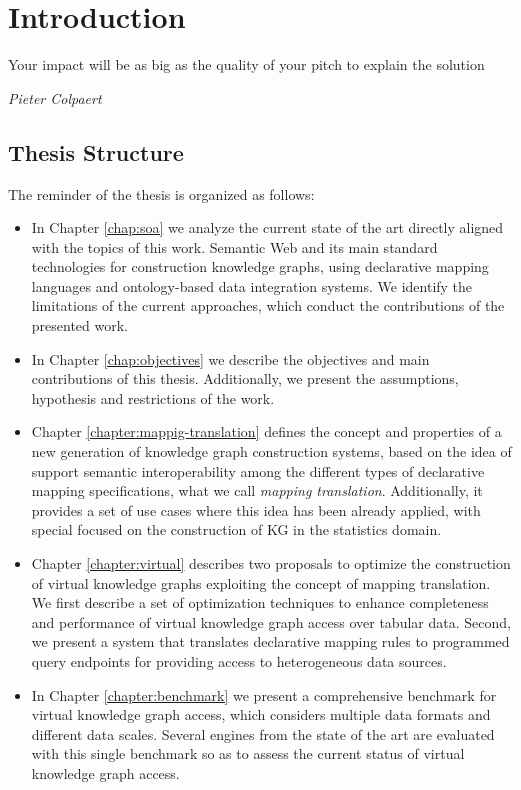 \chapter{Introduction}
\label{chap:intro}

\epigraph{Your impact will be as big as the quality of your pitch to explain the solution}{\textit{Pieter Colpaert}}

\section{Thesis Structure}
\label{sec:thesisstructure}
The reminder of the thesis is organized as follows:
\begin{itemize}
    \item In Chapter \ref{chap:soa} we analyze the current state of the art directly aligned with the topics of this work. Semantic Web and its main standard technologies for construction knowledge graphs, using declarative mapping languages and ontology-based data integration systems. We identify the limitations of the current approaches, which conduct the contributions of the presented work.
    \item In Chapter \ref{chap:objectives} we describe the objectives and main contributions of this thesis. Additionally, we present the assumptions, hypothesis and restrictions of the work.
    \item Chapter \ref{chapter:mappig-translation} defines the concept and properties of a new generation of knowledge graph construction systems, based on the idea of support semantic interoperability among the different types of declarative mapping specifications, what we call \textit{mapping translation}. Additionally, it provides a set of use cases where this idea has been already applied, with special focused on the construction of KG in the statistics domain.
    \item Chapter \ref{chapter:virtual} describes two proposals to optimize the construction of virtual knowledge graphs exploiting the concept of mapping translation. We first describe a set of optimization techniques to enhance completeness and performance of virtual knowledge graph access over tabular data. Second, we present a system that translates declarative mapping rules to programmed query endpoints for providing access to heterogeneous data sources.
    \item In Chapter \ref{chapter:benchmark} we present a comprehensive benchmark for virtual knowledge graph access, which considers multiple data formats and different data scales. Several engines from the state of the art are evaluated with this single benchmark so as to assess the current status of virtual knowledge graph access.

\end{itemize}
